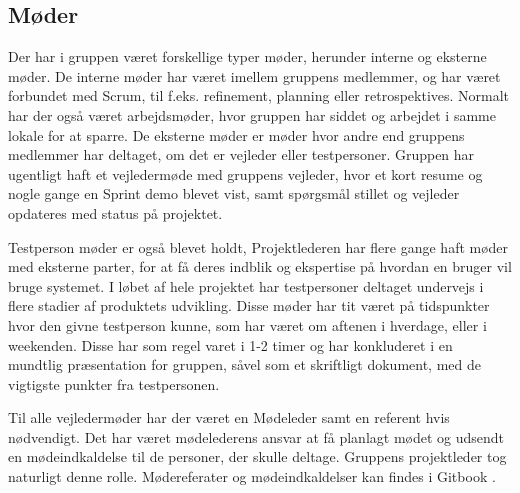 \subsection{Møder}

Der har i gruppen været forskellige typer møder, herunder interne og eksterne møder. De interne møder har været imellem gruppens medlemmer, og har været forbundet med Scrum, til f.eks. refinement, planning eller retrospektives. Normalt har der også været arbejdsmøder, hvor gruppen har siddet og arbejdet i samme lokale for at sparre. De eksterne møder er møder hvor andre end gruppens medlemmer har deltaget, om det er vejleder eller testpersoner. Gruppen har ugentligt haft et vejledermøde med gruppens vejleder, hvor et kort resume og nogle gange en Sprint demo blevet vist, samt spørgsmål stillet og vejleder opdateres med status på projektet.

Testperson møder er også blevet holdt, Projektlederen har flere gange haft møder med eksterne parter, for at få deres indblik og ekspertise på hvordan en bruger vil bruge systemet. I løbet af hele projektet har testpersoner deltaget undervejs i flere stadier af produktets udvikling. Disse møder har tit været på tidspunkter hvor den givne testperson kunne, som har været om aftenen i hverdage, eller i weekenden. Disse har som regel varet i 1-2 timer og har konkluderet i en mundtlig præsentation for gruppen, såvel som et skriftligt dokument, med de vigtigste punkter fra testpersonen.

Til alle vejledermøder har der været en Mødeleder samt en referent hvis nødvendigt. Det har været mødelederens ansvar at få planlagt mødet og udsendt en mødeindkaldelse til de personer, der skulle deltage. Gruppens projektleder tog naturligt denne rolle. Mødereferater og mødeindkaldelser kan findes i Gitbook \cite{Team-Meetings}.